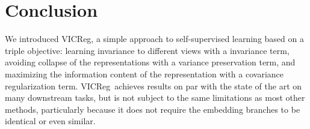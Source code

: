\documentclass{article} %
\newcommand{\algo}{VICReg}
\newcommand{\expander}{expander }
\begin{document}

\section{Conclusion} \label{sec:conclusion}
We introduced \algo, a simple approach to self-supervised learning based on a triple objective: learning invariance to different views with a invariance term, avoiding collapse of the representations with a variance preservation term, and maximizing the information content of the representation with a covariance regularization term. \algo \ achieves results on par with the state of the art on many downstream tasks, but is not subject to the same limitations as most other methods, particularly because it does not require the embedding branches to be identical or even similar.


\end{document}
